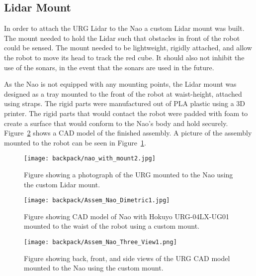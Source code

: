 \subsection{Lidar Mount}
In order to attach the URG Lidar to the Nao a custom Lidar mount was built.
The mount needed to hold the Lidar such that obstacles in front of the robot
could be sensed. The mount needed to be lightweight, rigidly attached, and allow
the robot to move its head to track the red cube. It should also not inhibit
the use of the sonars, in the event that the sonars are used in the future.

As the Nao is not equipped with any mounting points, the Lidar mount was 
designed as a tray mounted to the front of the robot at waist-height, attached
using straps. The rigid parts were manufactured out of PLA plastic using a 3D
printer. The rigid parts that would contact the robot were padded with foam to
create a surface that would conform to the Nao's body and hold securely.
Figure~\ref{fig:nao_lidar_mount_nao_dimetric1} shows a CAD model of the finished
assembly.
A picture of the assembly mounted to the robot can be seen in
Figure~\ref{fig:nao_lidar_mount_picture1}.

\begin{figure}
\centering
\texttt{[image: backpack/nao\_with\_mount2.jpg]}
\caption{Figure showing a photograph of the URG mounted to the Nao using the
         custom Lidar mount.}
\label{fig:nao_lidar_mount_picture1}
\end{figure}

\begin{figure}
\centering
\texttt{[image: backpack/Assem\_Nao\_Dimetric1.jpg]}
\caption{Figure showing CAD model of Nao with Hokuyo URG-04LX-UG01 mounted
         to the waist of the robot using a custom mount.}
\label{fig:nao_lidar_mount_nao_dimetric1}
\end{figure}

\begin{figure}
\centering
\texttt{[image: backpack/Assem\_Nao\_Three\_View1.png]}
\caption{Figure showing back, front, and side views of the URG CAD model 
         mounted to the Nao using the custom mount.}
\label{fig:nao_lidar_mount_nao_three_view1}
\end{figure}


